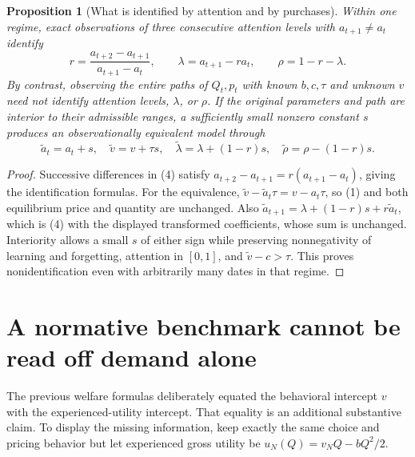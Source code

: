 \documentclass[11pt]{article}
\newtheorem{proposition}[theorem]{Proposition}
\theoremstyle{remark}\newtheorem{remark}[theorem]{Remark}
\begin{document}
\begin{proposition}[What is identified by attention and by purchases]
Within one regime, exact observations of three consecutive attention levels with $a_{t+1}\ne a_t$ identify
\[
 r=\frac{a_{t+2}-a_{t+1}}{a_{t+1}-a_t},\qquad
 \lambda=a_{t+1}-ra_t,\qquad \rho=1-r-\lambda.
\]
By contrast, observing the entire paths of $Q_t,p_t$ with known $b,c,\tau$ and unknown $v$ need not identify attention levels, $\lambda$, or $\rho$. If the original parameters and path are interior to their admissible ranges, a sufficiently small nonzero constant $s$ produces an observationally equivalent model through
\[
 \widetilde a_t=a_t+s,\quad \widetilde v=v+\tau s,\quad
 \widetilde\lambda=\lambda+(1-r)s,\quad
 \widetilde\rho=\rho-(1-r)s.
\]
\end{proposition}
\begin{proof}
Successive differences in (4) satisfy $a_{t+2}-a_{t+1}=r(a_{t+1}-a_t)$, giving the identification formulas. For the equivalence, $\widetilde v-\widetilde a_t\tau=v-a_t\tau$, so (1) and both equilibrium price and quantity are unchanged. Also
$\widetilde a_{t+1}=\lambda+(1-r)s+r\widetilde a_t$, which is (4) with the displayed transformed coefficients, whose sum is unchanged. Interiority allows a small $s$ of either sign while preserving nonnegativity of learning and forgetting, attention in $[0,1]$, and $\widetilde v-c>\tau$. This proves nonidentification even with arbitrarily many dates in that regime.
\end{proof}

\section*{A normative benchmark cannot be read off demand alone}
The previous welfare formulas deliberately equated the behavioral intercept $v$ with the experienced-utility intercept. That equality is an additional substantive claim. To display the missing information, keep exactly the same choice and pricing behavior but let experienced gross utility be $u_N(Q)=v_NQ-bQ^2/2$.
\end{document}
